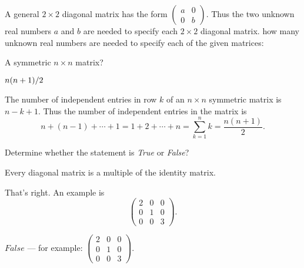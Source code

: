 \documentclass{ximera}
\def\mattwo#1#2#3#4{\left(\begin{array}{rr} #1 & #2 \\ #3 & #4\end{array}\right)}
\begin{document}
\noindent A general $2\times 2$ diagonal matrix has the form $\mattwo{a}{0}{0}{b}$.  Thus the two unknown real numbers $a$ and $b$ are needed to specify each $2\times 2$ diagonal matrix.  how many unknown real numbers are needed to specify each of the given matrices:

\begin{exercise}  \label{c1.3.3c}
A symmetric $n\times n$ matrix?   
\begin{prompt}$n(n+1)/2$\end{prompt}

\begin{solution}
The number of independent entries in row $k$ of an $n\times n$ symmetric matrix is $n-k+1$.  Thus the number of independent entries in the matrix is 
\[
n + (n-1) + \cdots + 1 = 1 + 2 + \cdots + n = \sum_{k=1}^n k = \frac{n(n + 1)}{2}.
\]
\end{solution}
\end{exercise}





\problemlabel

\noindent Determine whether the statement is {\em True\/} or {\em False\/}?

\begin{exercise} \label{c1.3.4b}
  Every diagonal matrix is a multiple of the identity matrix.
  \begin{multipleChoice}
  \end{multipleChoice}
  \begin{feedback}
    That's right.   An example is
    \[\left(\begin{array}{ccc}
              2 & 0 & 0 \\
              0 & 1 & 0 \\
              0 & 0 & 3 \end{array}\right).\]
  \end{feedback}

\begin{solution}
$False$ --- for example:
$\left(\begin{array}{ccc}
2 & 0 & 0 \\
0 & 1 & 0 \\
0 & 0 & 3 \end{array}\right)$.

\end{solution}
\end{exercise}
\end{document}
